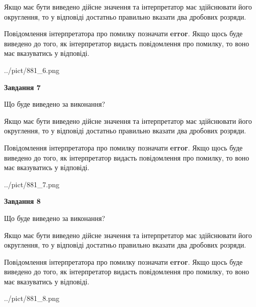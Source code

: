 \documentclass[12pt, ukrainian]{article}
\begin{document}
{\begin {Large}
Якщо має бути виведено дійсне значення та інтерпретатор має здійснювати його округлення, 
то у відповіді достатньо правильно вказати два дробових розряди.

Повідомлення інтерпретатора про помилку позначати \textbf{error}.
Якщо щось буде виведено до того, як інтерпретатор видасть повідомлення про помилку, 
то воно має вказуватись у відповіді. \par

\begin{center}
	{../pict/881_6.png}
\end{center}
\newpage

{\begin {center}\textbf{Завдання 7}\end {center}}\par
Що буде виведено за виконання? \par

Якщо має бути виведено дійсне значення та інтерпретатор має здійснювати його округлення, 
то у відповіді достатньо правильно вказати два дробових розряди.

Повідомлення інтерпретатора про помилку позначати \textbf{error}.
Якщо щось буде виведено до того, як інтерпретатор видасть повідомлення про помилку, 
то воно має вказуватись у відповіді. \par

\begin{center}
	{../pict/881_7.png}
\end{center}
\newpage

{\begin {center}\textbf{Завдання 8}\end {center}}\par
Що буде виведено за виконання? \par

Якщо має бути виведено дійсне значення та інтерпретатор має здійснювати його округлення, 
то у відповіді достатньо правильно вказати два дробових розряди.

Повідомлення інтерпретатора про помилку позначати \textbf{error}.
Якщо щось буде виведено до того, як інтерпретатор видасть повідомлення про помилку, 
то воно має вказуватись у відповіді. \par

\begin{center}
	{../pict/881_8.png}
\end{center}
\newpage


\end{Large}}
\end{document}
